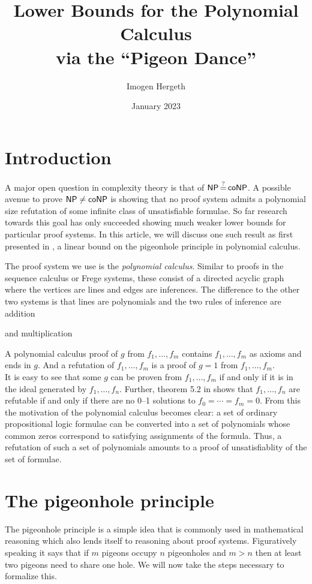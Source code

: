 \documentclass{article}
\title{Lower Bounds for the Polynomial Calculus\\via the ``Pigeon Dance''}
\author{Imogen Hergeth}
\date{January 2023}
\begin{document}
\maketitle

\section{Introduction}
A major open question in complexity theory is that of $\NP \queq \co\NP$. A possible avenue to prove $\NP \neq \co\NP$ is showing that no proof system admits a polynomial size refutation of some infinite class of unsatisfiable formulae. So far research towards this goal has only succeeded showing much weaker lower bounds for particular proof systems. In this article, we will discuss one such result as first presented in \cite{raz}, a linear bound on the pigeonhole principle in polynomial calculus.

The proof system we use is the \textit{polynomial calculus}. Similar to proofs in the sequence calculus or Frege systems, these consist of a directed acyclic graph where the vertices are lines and edges are inferences. The difference to the other two systems is that lines are polynomials and the two rules of inference are addition
\begin{prooftree}
\end{prooftree}
and multiplication
\begin{prooftree}
\end{prooftree}
A polynomial calculus proof of $g$ from $f_1, \ldots, f_m$ contains $f_1, \ldots, f_m$ as axioms and ends in $g$. And a refutation of $f_1, \ldots, f_m$ is a proof of $g = 1$ from $f_1, \ldots, f_m$.\\
It is easy to see that some $g$ can be proven from $f_1, \ldots, f_m$ if and only if it is in the ideal generated by $f_1, \ldots, f_n$. Further, theorem 5.2 in \cite{buss} shows that $f_1, \ldots, f_n$ are refutable if and only if there are no 0--1 solutions to $f_0 = \cdots = f_m = 0$. From this the motivation of the polynomial calculus becomes clear: a set of ordinary propositional logic formulae can be converted into a set of polynomials whose common zeros correspond to satisfying assignments of the formula. Thus, a refutation of such a set of polynomials amounts to a proof of unsatisfiablity of the set of formulae.


\section{The pigeonhole principle}
The pigeonhole principle is a simple idea that is commonly used in mathematical reasoning which also lends itself to reasoning about proof systems. Figuratively speaking it says that if $m$ pigeons occupy $n$ pigeonholes and $m > n$ then at least two pigeons need to share one hole. We will now take the steps necessary to formalize this.
\end{document}

